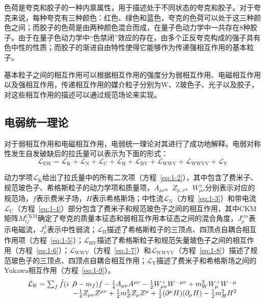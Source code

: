 色荷是夸克和胶子的一种内禀属性，用于描述处于不同状态的夸克和胶子。对于夸克来说，每种夸克有三种颜色：红色、绿色和蓝色，夸克的色荷可以处于这三种颜色之间；而胶子的色荷是由两种颜色混合而成，在量子色动力学中一共存在8种胶子。由于在量子色动力学中“色禁闭”效应的存在，由多个正反夸克构成的强子具有色中性的性质；而胶子的渐进自由特性使得它能够作为传递强相互作用的基本粒子。

基本粒子之间的相互作用可以根据相互作用的强度分为弱相互作用、电磁相互作用以及强相互作用，传递相互作用的媒介粒子分别为W、Z玻色子、光子以及胶子，对这些相互作用的描述可以通过规范场论来实现。

\subsection{电弱统一理论}

对于弱相互作用和电磁相互作用，电弱统一理论对其进行了成功地解释。电弱对称性发生自发破缺后的拉氏量可以表示为下面的形式：
\begin{equation}\label{eq:1-1}
    \mathcal{L}_{\mathrm{EW}}=\mathcal{L}_{\mathrm{K}}+\mathcal{L}_{\mathrm{N}}+\mathcal{L}_{\mathrm{C}}+\mathcal{L}_{\mathrm{H}}+\mathcal{L}_{\mathrm{HV}}+\mathcal{L}_{\mathrm{WWV}}+\mathcal{L}_{\mathrm{WWVV}}+\mathcal{L}_{\mathrm{Y}}
\end{equation}

动力学项$\mathcal{L}_{\mathrm{K}}$给出了拉氏量中的所有二次项（方程~\eqref{eq:1-2}），其中包含了费米子、规范玻色子、希格斯粒子的动力学项和质量项，$A_{\mu\nu}$、$Z_{\mu,\nu}$、$W^{\pm}_{\mu\nu}$分别表示对应的规范场，$f$表示费米子场，$H$表示希格斯场；中性流$\mathcal{L}_{\mathrm{N}}$（方程~\eqref{eq:1-3}）和带电流$\mathcal{L}_{\mathrm{C}}$（方程~\eqref{eq:1-4}）部分包含了费米子和规范玻色子之间的相互作用，其中CKM矩阵$M_{i j}^{\mathrm{CKM}}$确定了夸克的质量本征态和弱相互作用本征态之间的混合角度，$J_{\mu}^{em}$表示电磁流，$J_{\mu}^{3}$表示中性弱流；$\mathcal{L}_{\mathrm{H}}$描述了希格斯粒子的三顶点、四顶点自耦合相互作用项（方程~\eqref{eq:1-5}）；$\mathcal{L}_{\mathrm{HV}}$描述了希格斯粒子和规范矢量玻色子之间的相互作用（方程~\eqref{eq:1-6}）；$\mathcal{L}_{\mathrm{WWV}}$（方程~\eqref{eq:1-7}）和$\mathcal{L}_{\mathrm{WWVV}}$（方程~\eqref{eq:1-8}）描述了规范玻色子的三顶点、四顶点自耦合相互作用；$\mathcal{L}_{\mathrm{Y}}$描述了费米子和希格斯场之间的Yukawa相互作用（方程~\eqref{eq:1-9}）。
\begin{equation}\label{eq:1-2}
    \begin{array}{r}
        \mathcal{L}_{\mathrm{K}}=\sum_{f} \bar{f}(i \not\partial -m_{f}) f-\frac{1}{4} A_{\mu \nu} A^{\mu \nu}-\frac{1}{2} W_{\mu \nu}^{+} W^{-\mu \nu}+m_{W}^{2} W_{\mu}^{+} W^{-\mu} \\
        -\frac{1}{4} Z_{\mu \nu} Z^{\mu \nu}+\frac{1}{2} m_{Z}^{2} Z_{\mu} Z^{\mu}+\frac{1}{2}(\partial^{\mu} H)(\partial_{\mu} H)-\frac{1}{2} m_{H}^{2} H^{2}
    \end{array}
\end{equation}

